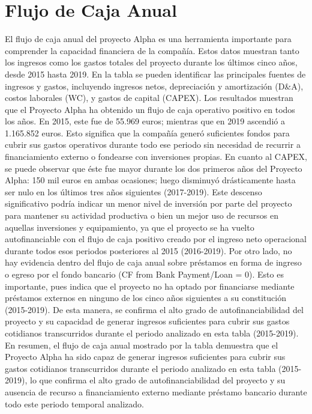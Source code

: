 \section{Flujo de Caja Anual}El flujo de caja anual del proyecto Alpha es una herramienta importante para comprender la capacidad financiera de la compañía. Estos datos muestran tanto los ingresos como los gastos totales del proyecto durante los últimos cinco años, desde 2015 hasta 2019. En la tabla se pueden identificar las principales fuentes de ingresos y gastos, incluyendo ingresos netos, depreciación y amortización (D&A), costos laborales (WC), y gastos de capital (CAPEX).
Los resultados muestran que el Proyecto Alpha ha obtenido un flujo de caja operativo positivo en todos los años. En 2015, este fue de 55.969 euros; mientras que en 2019 ascendió a 1.165.852 euros. Esto significa que la compañía generó suficientes fondos para cubrir sus gastos operativos durante todo ese periodo sin necesidad de recurrir a financiamiento externo o fondearse con inversiones propias.
En cuanto al CAPEX, se puede observar que éste fue mayor durante los dos primeros años del Proyecto Alpha: 150 mil euros en ambas ocasiones; luego disminuyó drásticamente hasta ser nulo en los últimos tres años siguientes (2017-2019). Este descenso significativo podría indicar un menor nivel de inversión por parte del proyecto para mantener su actividad productiva o bien un mejor uso de recursos en aquellas inversiones y equipamiento, ya que el proyecto se ha vuelto autofinanciable con el flujo de caja positivo creado por el ingreso neto operacional durante todos esos periodos posteriores al 2015 (2016-2019).
Por otro lado, no hay evidencia dentro del flujo de caja anual sobre préstamos en forma de ingreso o egreso por el fondo bancario (CF from Bank Payment/Loan = 0). Esto es importante, pues indica que el proyecto no ha optado por financiarse mediante préstamos externos en ninguno de los cinco años siguientes a su constitución (2015-2019). De esta manera, se confirma el alto grado de autofinanciabilidad del proyecto y su capacidad de generar ingresos suficientes para cubrir sus gastos cotidianos transcurridos durante el periodo analizado en esta tabla (2015-2019). En resumen, el flujo de caja anual mostrado por la tabla demuestra que el Proyecto Alpha ha sido capaz de generar ingresos suficientes para cubrir sus gastos cotidianos transcurridos durante el periodo analizado en esta tabla (2015-2019), lo que confirma el alto grado de autofinanciabilidad del proyecto y su ausencia de recurso a financiamiento externo mediante préstamo bancario durante todo este periodo temporal analizado.
